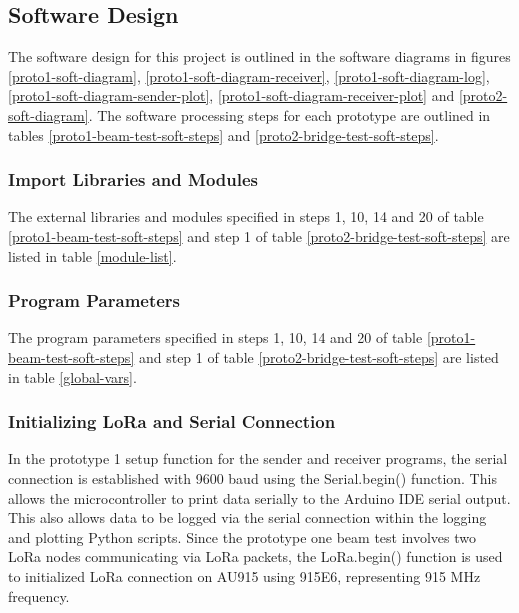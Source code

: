 \subsection{Software Design}
The software design for this project is outlined in the software diagrams in figures \ref{proto1-soft-diagram}, \ref{proto1-soft-diagram-receiver}, \ref{proto1-soft-diagram-log}, \ref{proto1-soft-diagram-sender-plot}, \ref{proto1-soft-diagram-receiver-plot} and \ref{proto2-soft-diagram}. The software processing steps for each prototype are outlined in tables \ref{proto1-beam-test-soft-steps} and \ref{proto2-bridge-test-soft-steps}. 

\subsubsection{Import Libraries and Modules}
The external libraries and modules specified in steps 1, 10, 14 and 20 of table \ref{proto1-beam-test-soft-steps} and step 1 of table \ref{proto2-bridge-test-soft-steps} are listed in table \ref{module-list}. 

\subsubsection{Program Parameters}
The program parameters specified in steps 1, 10, 14 and 20 of table \ref{proto1-beam-test-soft-steps} and step 1 of table \ref{proto2-bridge-test-soft-steps} are listed in table \ref{global-vars}.

\subsubsection{Initializing LoRa and Serial Connection}
In the prototype 1 setup function for the sender and receiver programs, the serial connection is established with 9600 baud using the Serial.begin() function. This allows the microcontroller to print data serially to the Arduino IDE serial output. This also allows data to be logged via the serial connection within the logging and plotting Python scripts. Since the prototype one beam test involves two LoRa nodes communicating via LoRa packets, the LoRa.begin() function is used to initialized LoRa connection on AU915 using 915E6, representing 915 MHz frequency. 
